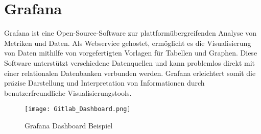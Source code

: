\section{Grafana}\label{sec:Grafana}
Grafana ist eine Open-Source-Software zur plattformübergreifenden Analyse von Metriken und Daten. Als Webservice gehostet, ermöglicht es die Visualisierung von Daten mithilfe von vorgefertigten Vorlagen für Tabellen und Graphen. Diese Software unterstützt verschiedene Datenquellen und kann problemlos direkt mit einer relationalen Datenbanken verbunden werden. Grafana erleichtert somit die präzise Darstellung und Interpretation von Informationen durch benutzerfreundliche Visualisierungstools. \cite{GrafanaWebsite}\\
\vspace{-1cm}
\begin{center}
    \begin{figure}[h]
     \centering
     \texttt{[image: Gitlab\_Dashboard.png]}
     \caption{Grafana Dashboard Beispiel \cite{GrafanaWebsite}}
     \label{fig:FuzzyLogicArchitektur}
    \end{figure}
   \end{center}

